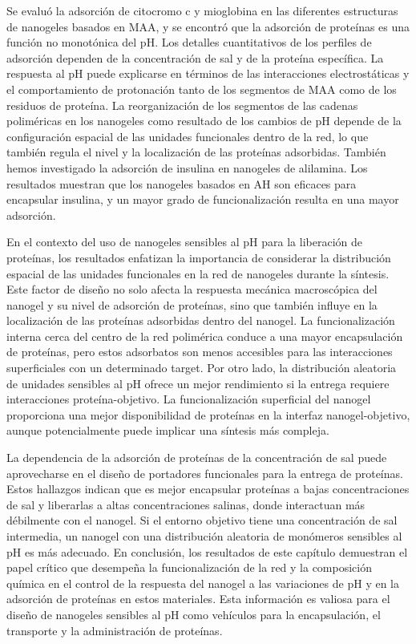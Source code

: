 Se evalu\'o la adsorci\'on de citocromo c y mioglobina en las diferentes estructuras de nanogeles basados en MAA, y se encontr\'o que la adsorci\'on de prote\'inas es una funci\'on no monot\'onica del pH.
Los detalles cuantitativos de los perfiles de adsorci\'on dependen de la concentraci\'on de sal y de la prote\'ina espec\'ifica.
La respuesta al pH puede explicarse en t\'erminos de las interacciones electrost\'aticas y el comportamiento de protonaci\'on tanto de los segmentos de MAA como de los residuos de prote\'ina.
La reorganizaci\'on de los segmentos de las cadenas polim\'ericas en los nanogeles como resultado de los cambios de pH depende de la configuraci\'on espacial de las unidades funcionales dentro de la red, lo que tambi\'en regula el nivel y la localizaci\'on de las prote\'inas adsorbidas.
Tambi\'en hemos investigado la adsorci\'on de insulina en nanogeles de alilamina.
Los  resultados muestran que los nanogeles basados en AH son eficaces para encapsular insulina, y un mayor grado de funcionalizaci\'on resulta en una mayor adsorci\'on.

En el contexto del uso de nanogeles sensibles al pH para la liberaci\'on de prote\'inas, los resultados enfatizan la importancia de considerar la distribuci\'on espacial de las unidades funcionales en la red de nanogeles durante la s\'intesis.
Este factor de dise\~no no solo afecta la respuesta mec\'anica macrosc\'opica del nanogel y su nivel de adsorci\'on de prote\'inas, sino que tambi\'en influye en la localizaci\'on de las prote\'inas adsorbidas dentro del nanogel.
La funcionalizaci\'on interna cerca del centro de la red polim\'erica conduce a una mayor encapsulaci\'on de prote\'inas, pero estos adsorbatos son menos accesibles para las interacciones superficiales con un determinado target.
Por otro lado, la distribuci\'on aleatoria de unidades sensibles al pH ofrece un mejor rendimiento si la entrega requiere interacciones prote\'ina-objetivo.
La funcionalizaci\'on superficial del nanogel proporciona una mejor disponibilidad de prote\'inas en la interfaz nanogel-objetivo, aunque potencialmente puede implicar una s\'intesis m\'as compleja.

La dependencia de la adsorci\'on de prote\'inas de la concentraci\'on de sal puede aprovecharse en el dise\~no de portadores funcionales para la entrega de prote\'inas.
Estos hallazgos indican que es mejor encapsular prote\'inas a bajas concentraciones de sal y liberarlas a altas concentraciones salinas, donde interactuan m\'as d\'ebilmente con el nanogel.
Si el entorno objetivo tiene una concentraci\'on de sal intermedia, un nanogel con una distribuci\'on aleatoria de mon\'omeros sensibles al pH es m\'as adecuado. En conclusi\'on, los resultados de este cap\'itulo demuestran el papel cr\'itico que desempe\~na la funcionalizaci\'on de la red y la composici\'on qu\'imica en el control de la respuesta del nanogel a las variaciones de pH y en la adsorci\'on de prote\'inas en estos materiales.
Esta informaci\'on es valiosa para el dise\~no de nanogeles sensibles al pH como veh\'iculos para la encapsulaci\'on, el transporte y la administraci\'on de prote\'inas.

